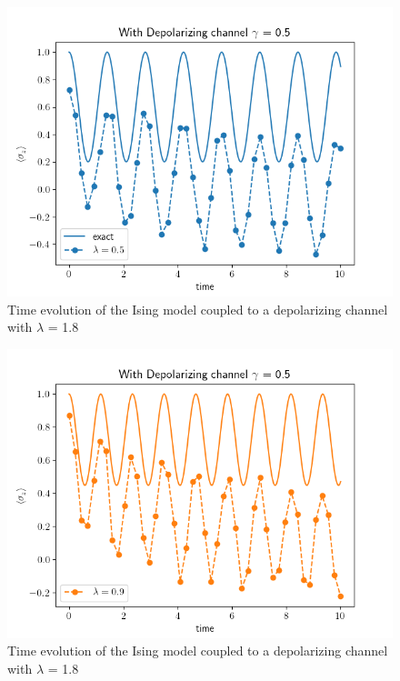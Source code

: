 \documentclass[12pt]{article}
\begin{document}
\begin{figure}[!htb]
    \centering
    \includegraphics[width=\textwidth]{images/DepolChannelLambda05.png}
    \caption{Time evolution of the Ising model coupled to a depolarizing channel with $\lambda$ = 1.8%
      \label{fig:DepolChannelLambda05}}
  \end{figure}

\begin{figure}[!htb]
    \centering
    \includegraphics[width=\textwidth]{images/DepolChannelLambda09.png}
    \caption{Time evolution of the Ising model coupled to a depolarizing channel with $\lambda$ = 1.8%
      \label{fig:DepolChannelLambda09}}
  \end{figure}
\end{document}
